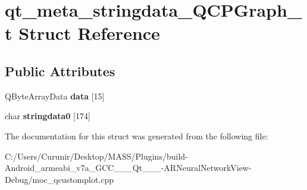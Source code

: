 \hypertarget{structqt__meta__stringdata___q_c_p_graph__t}{}\section{qt\+\_\+meta\+\_\+stringdata\+\_\+\+Q\+C\+P\+Graph\+\_\+t Struct Reference}
\label{structqt__meta__stringdata___q_c_p_graph__t}
\subsection*{Public Attributes}
\begin{DoxyCompactItemize}
\item 
\mbox{\label{structqt__meta__stringdata___q_c_p_graph__t_aef768bfc9aa8b57ddd273556a42baa3c}} 
Q\+Byte\+Array\+Data {\bfseries data} \mbox{[}15\mbox{]}
\item 
\mbox{\label{structqt__meta__stringdata___q_c_p_graph__t_a3292f3d33ea061a1299d1c727a9e0788}} 
char {\bfseries stringdata0} \mbox{[}174\mbox{]}
\end{DoxyCompactItemize}


The documentation for this struct was generated from the following file\+:\begin{DoxyCompactItemize}
\item 
C\+:/\+Users/\+Curunir/\+Desktop/\+M\+A\+S\+S/\+Plugins/build-\/\+Android\+\_\+armeabi\+\_\+v7a\+\_\+\+G\+C\+C\+\_\+\_\+\_\+\+Qt\+\_\+\_\+\_-\/\+A\+R\+Neural\+Network\+View-\/\+Debug/moc\+\_\+qcustomplot.\+cpp\end{DoxyCompactItemize}
